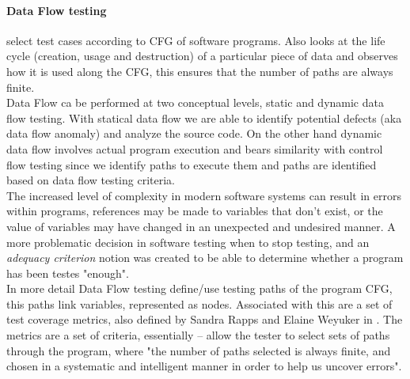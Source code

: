 \documentclass[citeauthoryear]{llncs}
\begin{document}
\paragraph{Data Flow testing} select test cases according to CFG of software programs. Also looks at the life cycle (creation, usage and destruction)
of a particular piece of data and observes how it is used along the CFG, this ensures that the number of paths are always finite\cite{dataflow}.\\
Data Flow ca be performed at two conceptual levels, static and dynamic data flow testing. With statical data flow we are able to identify potential
defects (aka data flow anomaly) and analyze the source code. On the other hand dynamic data flow involves actual program execution and bears similarity with control flow testing
since we identify paths to execute them and paths are identified based on data flow testing criteria.\\
The increased level of complexity in modern software systems can result in errors within programs, references may be made to variables that don't exist,
or the value of variables may have changed in an unexpected and undesired manner. A more problematic decision in software testing when to stop testing,
and an \textit{adequacy criterion}\cite{Frankl:1988:AFD:53064.53075} notion was created to be able to determine whether a program has been testes "enough".\\
In more detail Data Flow testing define/use testing paths of the program CFG, this paths link variables, represented as nodes\cite{dataflow}.
Associated with this are a set of test coverage metrics, also defined by Sandra Rapps and Elaine Weyuker in \cite{dataflow}.
The metrics are a set of criteria, essentially – allow the tester to select sets of paths through the program, where "the number of paths selected
is always finite, and chosen in a systematic and intelligent manner in order to
help us uncover errors".
\end{document}

